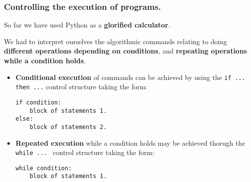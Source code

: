 \documentclass{beamer} %
\newcommand\emc[1]{\textcolor{brightblue}{\textbf{#1}}}
\begin{document}
\begin{frame}[fragile]
\frametitle{Controlling the execution of programs.} 

So far we have used Python as a \emc{glorified calculator}. 

\vspace{2mm}
We had to interpret ourselves the algorithmic commands relating to doing \emc{different operations depending on conditions}, and \emc{repeating operations while a condition holds}.

\vspace{2mm}
\begin{itemize}
	\item \emc{Conditional execution} of commands can be achieved by using the \texttt{if ... then ...} control structure taking the form:
\begin{Verbatim}[fontsize=\scriptsize]
if condition:
    block of statements 1.
else:
    block of statements 2.
\end{Verbatim}

	\item \emc{Repeated execution} while a condition holds may be achieved thorugh the \texttt{while ... } control structure taking the form:
\begin{Verbatim}[fontsize=\scriptsize]
while condition:
    block of statements 1.
\end{Verbatim}

\end{itemize}

\end{frame}

\end{document}
